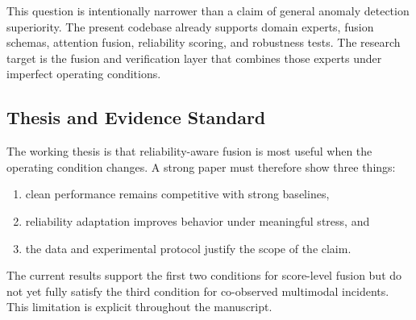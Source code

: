 \documentclass[10pt,conference]{IEEEtran}
\begin{document}
This question is intentionally narrower than a claim of general anomaly
detection superiority. The present codebase already supports domain experts,
fusion schemas, attention fusion, reliability scoring, and robustness tests.
The research target is the fusion and verification layer that combines those
experts under imperfect operating conditions.

\subsection{Thesis and Evidence Standard}
The working thesis is that reliability-aware fusion is most useful when the
operating condition changes. A strong paper must therefore show three things:
\begin{enumerate}
  \item clean performance remains competitive with strong baselines,
  \item reliability adaptation improves behavior under meaningful stress, and
  \item the data and experimental protocol justify the scope of the claim.
\end{enumerate}
The current results support the first two conditions for score-level fusion but
do not yet fully satisfy the third condition for co-observed multimodal
incidents. This limitation is explicit throughout the manuscript.
\end{document}
